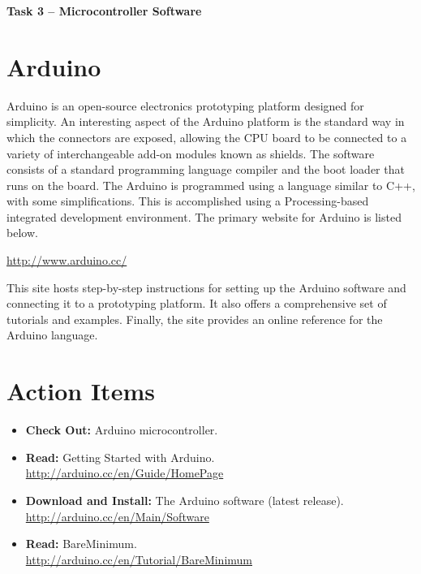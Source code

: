 \documentclass[11pt]{article}
\begin{document}
\begin{center}
{\bfseries \LARGE Task 3 -- Microcontroller Software\\[8mm]}
\end{center}


\section{Arduino}

Arduino is an open-source electronics prototyping platform designed for simplicity.
An interesting aspect of the Arduino platform is the standard way in which the connectors are exposed, allowing the CPU board to be connected to a variety of interchangeable add-on modules known as shields.
The software consists of a standard programming language compiler and the boot loader that runs on the board.
The Arduino is programmed using a language similar to C++, with some simplifications.
This is accomplished using a Processing-based integrated development environment.
The primary website for Arduino is listed below.
\begin{center}
\url{http://www.arduino.cc/}
\end{center}
This site hosts step-by-step instructions for setting up the Arduino software and connecting it to a prototyping platform.
It also offers a comprehensive set of tutorials and examples.
Finally, the site provides an online reference for the Arduino language.

\section*{Action Items}

\begin{itemize}
\item \textbf{Check Out:} Arduino microcontroller.
\item \textbf{Read:} Getting Started with Arduino. \\
\url{http://arduino.cc/en/Guide/HomePage}
\item \textbf{Download and Install:} The Arduino software (latest release). \\
\url{http://arduino.cc/en/Main/Software}
\item \textbf{Read:} BareMinimum. \\
\url{http://arduino.cc/en/Tutorial/BareMinimum}
\end{itemize}
\end{document}
